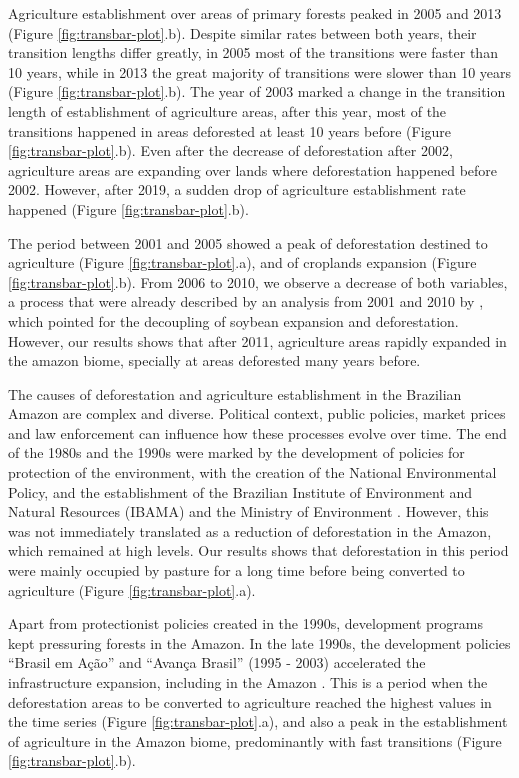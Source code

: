 \documentclass[essd, manuscript]{copernicus}
\begin{document}
Agriculture establishment over areas of primary forests peaked in 2005 and 2013 (Figure \ref{fig:transbar-plot}.b).
Despite similar rates between both years, their transition lengths differ greatly, in 2005 most of the transitions were faster than 10 years, while in 2013 the great majority of transitions were slower than 10 years (Figure \ref{fig:transbar-plot}.b).
The year of 2003 marked a change in the transition length of establishment of agriculture areas, after this year, most of the transitions happened in areas deforested at least 10 years before (Figure \ref{fig:transbar-plot}.b).
Even after the decrease of deforestation after 2002, agriculture areas are expanding over lands where deforestation happened before 2002.
However, after 2019, a sudden drop of agriculture establishment rate happened (Figure \ref{fig:transbar-plot}.b).

The period between 2001 and 2005 showed a peak of deforestation destined to agriculture (Figure \ref{fig:transbar-plot}.a), and of croplands expansion (Figure \ref{fig:transbar-plot}.b).
From 2006 to 2010, we observe a decrease of both variables, a process that were already described by an analysis from 2001 and 2010 by \citet{Macedo2012}, which pointed for the decoupling of soybean expansion and deforestation.
However, our results shows that after 2011, agriculture areas rapidly expanded in the amazon biome, specially at areas deforested many years before.

The causes of deforestation and agriculture establishment in the Brazilian Amazon are complex and diverse.
Political context, public policies, market prices and law enforcement can influence how these processes evolve over time.
The end of the 1980s and the 1990s were marked by the development of policies for protection of the environment, with the creation of the National Environmental Policy, and the establishment of the Brazilian Institute of Environment and Natural Resources (IBAMA) and the Ministry of Environment \citep{Banerjee2009}.
However, this was not immediately translated as a reduction of deforestation in the Amazon, which remained at high levels.
Our results shows that deforestation in this period were mainly occupied by pasture for a long time before being converted to agriculture (Figure \ref{fig:transbar-plot}.a).

Apart from protectionist policies created in the 1990s, development programs kept pressuring forests in the Amazon.
In the late 1990s, the development policies ``Brasil em Ação'' and ``Avança Brasil'' (1995 - 2003) accelerated the infrastructure expansion, including in the Amazon \citep{Carvalho2002}.
This is a period when the deforestation areas to be converted to agriculture reached the highest values in the time series (Figure \ref{fig:transbar-plot}.a), and also a peak in the establishment of agriculture in the Amazon biome, predominantly with fast transitions (Figure \ref{fig:transbar-plot}.b).
\end{document}
